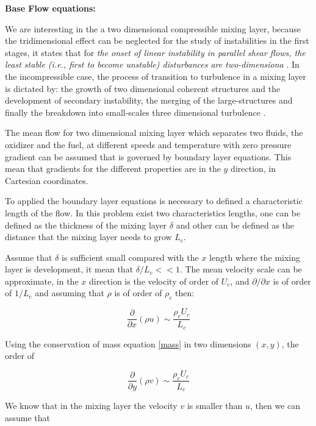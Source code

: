 \textbf{Base Flow equations:}

We are interesting in the a two dimensional compressible mixing layer, because the 
tridimensional effect can be neglected for the study of instabilities in the first stages, 
 it states that for {\it the onset of linear instability in parallel shear flows, the
 least stable (i.e., first to become unstable) disturbances are two-dimensiona} \cite{Squire}.
In the incompressible case, the process of transition to turbulence in a mixing layer 
is dictated by: the growth of two dimensional coherent structures and the development
of secondary instability,  the merging of the large-structures and finally the 
breakdown into small-scales three dimensional turbulence \cite{planche1992numerical}.

The mean flow for two dimensional mixing layer
which separates two fluids, the oxidizer and the fuel, 
at different speeds and temperature with zero pressure gradient can be assumed 
that is governed by boundary layer equations.
This mean that gradients for the different properties are in the $y$ direction, in Cartesian 
coordinates.

To applied the boundary layer equations is necessary  to defined a characteristic 
length of the flow. In this problem exist two characteristics lengths, one
can be defined as the thickness  of the mixing layer $\delta$ and other can be 
defined as the distance that the mixing layer needs to grow $L_c$.

Assume that $\delta$  is sufficient small compared  with the $x$ length
where the mixing layer is development, it mean that $\delta/L_c<<1$.  
The mean velocity scale can be approximate, in the $x$ direction is the 
velocity of order of $U_c$,
and $\partial/\partial x$ is of order of $1/L_c$ 
and assuming that $\rho$ is of order of $\rho_c$ then:

\begin{equation}
\frac{\partial}{\partial x}(\rho u)\sim \frac{\rho_cU_c}{L_c}
\end{equation}

Using the conservation of mass equation \ref{mass} in two dimensions $(x,y)$, 
the order of 

\begin{equation}
\frac{\partial}{\partial y}(\rho v)\sim \frac{\rho_cU_c}{L_c}
\end{equation}

We know that in the mixing layer the velocity $v$ is smaller than
$u$, then we can assume that 


